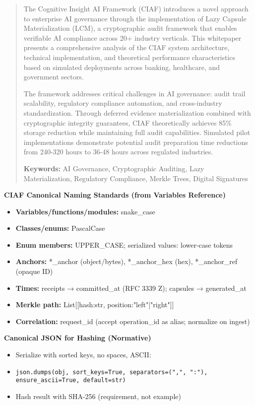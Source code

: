 \documentclass[12pt,a4paper]{article}
\begin{document}
\begin{abstract}
The Cognitive Insight AI Framework (CIAF) introduces a novel approach to enterprise AI governance through the implementation of Lazy Capsule Materialization (LCM\texttrademark), a cryptographic audit framework that enables verifiable AI compliance across 20+ industry verticals. This whitepaper presents a comprehensive analysis of the CIAF system architecture, technical implementation, and theoretical performance characteristics based on simulated deployments across banking, healthcare, and government sectors.

The framework addresses critical challenges in AI governance: audit trail scalability, regulatory compliance automation, and cross-industry standardization. Through deferred evidence materialization combined with cryptographic integrity guarantees, CIAF theoretically achieves 85\% storage reduction while maintaining full audit capabilities. Simulated pilot implementations demonstrate potential audit preparation time reductions from 240-320 hours to 36-48 hours across regulated industries.

\textbf{Keywords:} AI Governance, Cryptographic Auditing, Lazy Materialization, Regulatory Compliance, Merkle Trees, Digital Signatures
\end{abstract}

\begin{technicalbox}
\textbf{CIAF Canonical Naming Standards (from Variables Reference)}
\begin{itemize}
\item \textbf{Variables/functions/modules:} snake\_case
\item \textbf{Classes/enums:} PascalCase  
\item \textbf{Enum members:} UPPER\_CASE; serialized values: lower-case tokens
\item \textbf{Anchors:} *\_anchor (object/bytes), *\_anchor\_hex (hex), *\_anchor\_ref (opaque ID)
\item \textbf{Times:} receipts → committed\_at (RFC 3339 Z); capsules → generated\_at
\item \textbf{Merkle path:} List[[hash:str, position:"left"|"right"]]
\item \textbf{Correlation:} request\_id (accept operation\_id as alias; normalize on ingest)
\end{itemize}
\end{technicalbox}

\begin{infobox}
\textbf{Canonical JSON for Hashing (Normative)}
\begin{itemize}
\item Serialize with sorted keys, no spaces, ASCII:
\item \texttt{json.dumps(obj, sort\_keys=True, separators=(",", ":"), ensure\_ascii=True, default=str)}
\item Hash result with SHA-256 (requirement, not example)
\end{itemize}
\end{infobox}
\end{document}
